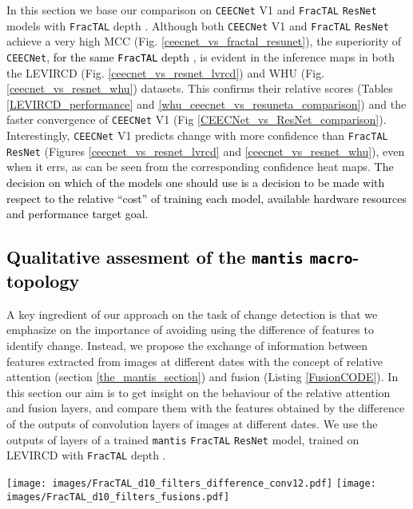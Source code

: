 \documentclass[times, 5p]{elsarticle}
\def \FracTAL {\texttt{FracTAL} }
\newcommand{\ceecnet}{\texttt{CEECNet}}
\newcommand{\mantis}{\texttt{mantis}}
\begin{document}
In this section we base our comparison on \ceecnet{} V1 and \FracTAL \texttt{ResNet} models with \FracTAL depth . 
Although both  \ceecnet{} V1  and  \FracTAL \texttt{ResNet} achieve a very high MCC (Fig. \ref{ceecnet_vs_fractal_resunet}), the superiority of \ceecnet{}, \textcolor{black}{for the same \FracTAL depth },  is evident in the inference maps in both  the LEVIRCD (Fig. \ref{ceecnet_vs_resnet_lvrcd})  and WHU (Fig. \ref{ceecnet_vs_resnet_whu}) datasets. This confirms their relative scores (Tables \ref{LEVIRCD_performance} and \ref{whu_ceecnet_vs_resuneta_comparison}) and the faster convergence of \ceecnet{} V1 (Fig \ref{CEECNet_vs_ResNet_comparison}). 
 Interestingly, \ceecnet{} V1 predicts change with more confidence than \FracTAL \texttt{ResNet} (Figures \ref{ceecnet_vs_resnet_lvrcd} and \ref{ceecnet_vs_resnet_whu}), even when it errs, as can be seen from the corresponding confidence heat maps. 
\textcolor{black}{The decision on which of the models one should use is a decision to be made with respect to the relative ``cost'' of training each model,  available hardware resources and performance target goal.}  





\subsection{\textcolor{black}{Qualitative assesment of the \mantis{} \texttt{macro}-topology}}

A key ingredient of our approach on the task of change detection is that we emphasize on the importance of avoiding using the difference of features to identify change. Instead, we propose the exchange of information between features extracted from images at different dates with the concept of relative attention (section \ref{the_mantis_section}) and fusion (Listing \ref{FusionCODE}). In this section our aim is to get insight on the behaviour of the relative attention and fusion layers, and compare them with the features obtained by the difference of the outputs of convolution layers of images at different dates. We use the outputs of layers of a trained \mantis{} \FracTAL \texttt{ResNet} model, trained on LEVIRCD with \FracTAL depth . 



\begin{figure*}
\centering
\texttt{[image: images/FracTAL\_d10\_filters\_difference\_conv12.pdf]}
\texttt{[image: images/FracTAL\_d10\_filters\_fusions.pdf]}
\caption{\textcolor{black}{For the same model as in Fig. \ref{FracTAL_d10_ratt12_n_21}  we plot the  difference of the first feature extractor blocks (left pannel) vs the first Fusion feature extraction block.  The entropy of the fusion features is half that of the difference channels. This means there is less ``surprise'' in the fusion filters, in comparison with the difference of filters, for the same trained network. }} 
\label{FracTAL_d10_diff_n_fusions}
\end{figure*}
\end{document}
